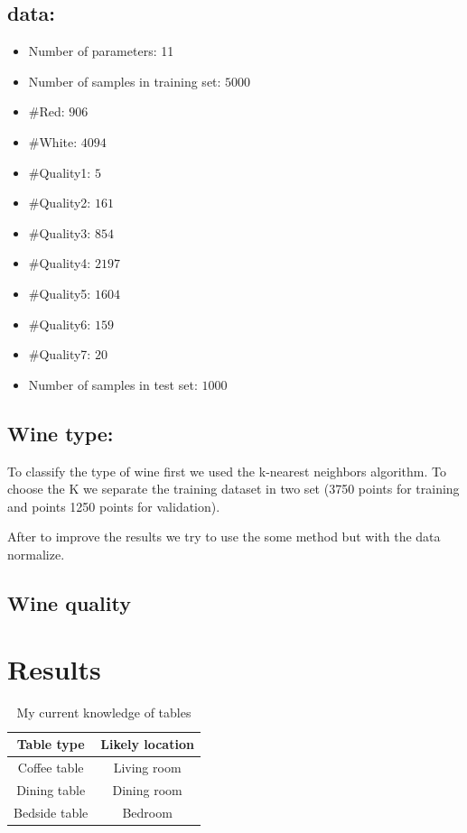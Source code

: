 \documentclass[twoside]{article}
\begin{document}
\begin{multicols}{2}
\subsection*{data:}
\begin{itemize}
  \item Number of parameters: 11
  \item Number of samples in training set: $5000$
  \item \#Red: $906$
  \item \#White: $4094$
  \item \#Quality1: $5$
  \item \#Quality2: $161$
  \item \#Quality3: $854$
  \item \#Quality4: $2197$
  \item \#Quality5: $1604$
  \item \#Quality6: $159$
  \item \#Quality7: $20$
  \item Number of samples in test set: $1000$
\end{itemize}
\subsection*{Wine type:}
\indent \par
To classify the type of wine first we used the k-nearest neighbors algorithm.
To choose the K we separate the training dataset in two set (3750 points for training and points 1250 points for validation). \par
After to improve the results we try to use the some method but with the data normalize.
\subsection*{Wine quality}



\section{Results}


\begin{table}[H]
\caption{My current knowledge of tables}
\centering
\begin{tabular}{cc}
\textbf{Table type} & \textbf{Likely location}\\
\midrule
Coffee table & Living room\\
Dining table & Dining room\\
Bedside table & Bedroom
\end{tabular}
\end{table}


\end{multicols}
\end{document}
